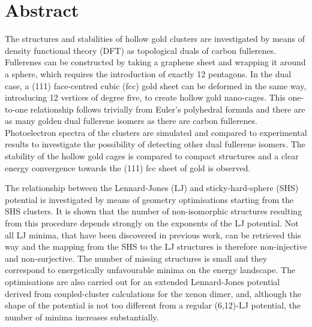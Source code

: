 
\chapter*{Abstract}


The structures and stabilities of hollow gold clusters are investigated by means
of density functional theory (DFT) as topological duals of carbon fullerenes.
Fullerenes can be constructed by taking a graphene sheet and wrapping it around
a sphere, which requires the introduction of exactly 12 pentagons. In the dual
case, a (111) face-centred cubic (fcc) gold sheet can be deformed in the same
way, introducing 12 vertices of degree five, to create hollow gold nano-cages.
This one-to-one relationship follows trivially from Euler's polyhedral formula
and there are as many golden dual fullerene isomers as there are carbon
fullerenes. Photoelectron spectra of the clusters are simulated and
compared to experimental results to investigate the possibility of detecting
other dual fullerene isomers. The stability of the hollow gold cages is compared
to compact structures and a clear energy convergence towards the (111) fcc sheet
of gold is observed. 

The relationship between the Lennard-Jones (LJ) and sticky-hard-sphere (SHS)
potential is investigated by means of geometry optimisations starting from the
SHS clusters. It is shown that the number of non-isomorphic structures resulting
from this procedure depends strongly on the exponents of the LJ potential. Not
all LJ minima, that have been discovered in previous work, can be retrieved this
way and the mapping from the SHS to the LJ structures is therefore non-injective
and non-surjective. The number of missing structures is small and they
correspond to energetically unfavourable minima on the energy landscape. The
optimisations are also carried out for an extended Lennard-Jones potential
derived from coupled-cluster calculations for the xenon dimer, and, although the
shape of the potential is not too different from a regular (6,12)-LJ potential,
the number of minima increases substantially.

